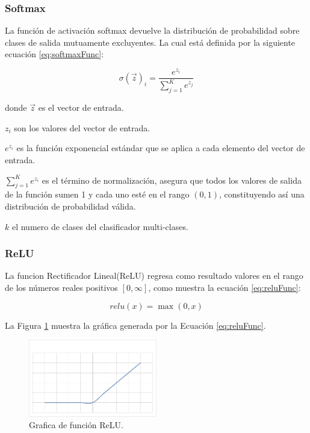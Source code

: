 \subsubsection{Softmax}

La función de activación softmax devuelve la distribución de probabilidad sobre clases de salida mutuamente excluyentes. La cual está definida por la siguiente ecuación \ref{eq:softmaxFunc}:

\begin{equation}
\label{eq:softmaxFunc}
  \sigma(\overrightarrow{z})_{i}=\frac{e^{z_{i}}}{
    \displaystyle\sum\limits_{j=1}^K e^{z_{j}}
  }
\end{equation}

donde $\overrightarrow{z}$ es el vector de entrada.

$z_i$ son los valores del vector de entrada.

$e^{z_{i}}$ es la función exponencial estándar que se aplica a cada elemento del vector de entrada.

$\displaystyle\sum\limits_{j=1}^K e^{z_{i}}$ es el término de normalización, asegura que todos los valores de salida de la función sumen 1 y cada uno esté en el rango $(0, 1)$, constituyendo así una distribución de probabilidad válida.

$k$ el numero de clases del clasificador multi-clases.

\subsubsection{ReLU}

La funcion Rectificador Lineal(ReLU) regresa como resultado valores en el rango de los números reales positivos $[0, \infty]$, como muestra la ecuación \ref{eq:reluFunc}:

\begin{equation}
\label{eq:reluFunc}
  relu(x)=\max(0,x)
\end{equation}

La Figura \ref{fig:graficaReLU} muestra la gráfica generada por la Ecuación \ref{eq:reluFunc}.

\begin{figure}[H]
    \centering
    \includegraphics[width=0.5\textwidth]{MarcoTeorico/imgs/GraficaReLU.jpg}
    \caption{Grafica de función ReLU.}
    \label{fig:graficaReLU}
\end{figure}

